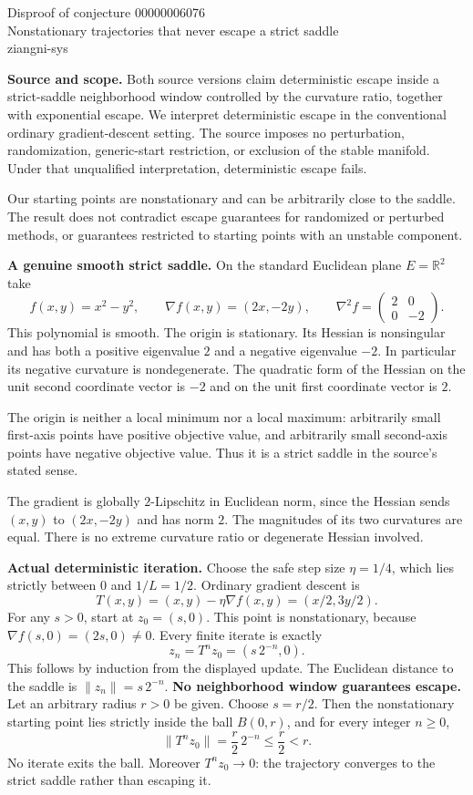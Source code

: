 \documentclass[11pt]{article}
\begin{document}
\begin{center}
{\Large Disproof of conjecture 00000006076}\\[5pt]
Nonstationary trajectories that never escape a strict saddle\\
ziangni-sys
\end{center}
\textbf{Source and scope.}
Both source versions claim deterministic escape inside a strict-saddle neighborhood window controlled by the curvature ratio, together with exponential escape. We interpret deterministic escape in the conventional ordinary gradient-descent setting. The source imposes no perturbation, randomization, generic-start restriction, or exclusion of the stable manifold. Under that unqualified interpretation, deterministic escape fails.

Our starting points are nonstationary and can be arbitrarily close to the saddle. The result does not contradict escape guarantees for randomized or perturbed methods, or guarantees restricted to starting points with an unstable component.

\textbf{A genuine smooth strict saddle.}
On the standard Euclidean plane $E=\mathbb R^2$ take
\[
 f(x,y)=x^2-y^2,\qquad
 \nabla f(x,y)=(2x,-2y),\qquad
 \nabla^2 f=\begin{pmatrix}2&0\\0&-2\end{pmatrix}.
\]
This polynomial is smooth. The origin is stationary. Its Hessian is nonsingular and has both a positive eigenvalue $2$ and a negative eigenvalue $-2$. In particular its negative curvature is nondegenerate. The quadratic form of the Hessian on the unit second coordinate vector is $-2$ and on the unit first coordinate vector is $2$.

The origin is neither a local minimum nor a local maximum: arbitrarily small first-axis points have positive objective value, and arbitrarily small second-axis points have negative objective value. Thus it is a strict saddle in the source's stated sense.

The gradient is globally $2$-Lipschitz in Euclidean norm, since the Hessian sends $(x,y)$ to $(2x,-2y)$ and has norm $2$. The magnitudes of its two curvatures are equal. There is no extreme curvature ratio or degenerate Hessian involved.

\textbf{Actual deterministic iteration.}
Choose the safe step size $\eta=1/4$, which lies strictly between $0$ and $1/L=1/2$. Ordinary gradient descent is
\[
 T(x,y)=(x,y)-\eta\nabla f(x,y)
        =(x/2,3y/2).
\]
For any $s>0$, start at $z_0=(s,0)$. This point is nonstationary, because $\nabla f(s,0)=(2s,0)\ne0$. Every finite iterate is exactly
\[
 z_n=T^n z_0=(s\,2^{-n},0).
\]
This follows by induction from the displayed update. The Euclidean distance to the saddle is $\|z_n\|=s\,2^{-n}$.
\newpage
\textbf{No neighborhood window guarantees escape.}
Let an arbitrary radius $r>0$ be given. Choose $s=r/2$. Then the nonstationary starting point lies strictly inside the ball $B(0,r)$, and for every integer $n\ge0$,
\[
 \|T^n z_0\|=\frac r2\,2^{-n}\le\frac r2<r.
\]
No iterate exits the ball. Moreover $T^n z_0\to0$: the trajectory converges to the strict saddle rather than escaping it.
\end{document}
